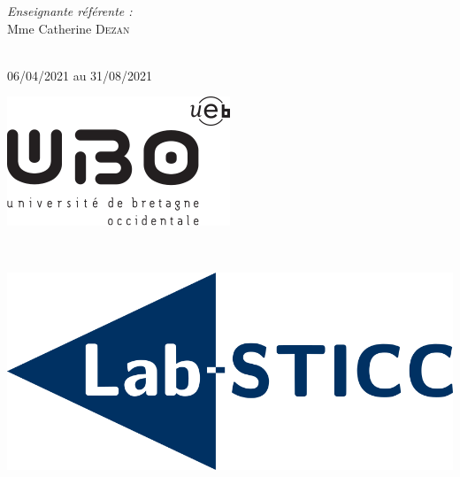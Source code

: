 \begin{titlepage}
	\begin{minipage}{0.4\textwidth}
    \begin{center} \large
    \emph{Enseignante référente :} \\
    Mme Catherine \textsc{Dezan} %
    \end{center}
    \end{minipage}\\[1cm]
    
    
    {\large 06/04/2021 au 31/08/2021}\\[1cm] %
    
    
	\begin{minipage}{0.45\textwidth}
        \begin{flushleft} \large
            \includegraphics[width=0.9\linewidth]{ubo.png} %
        \end{flushleft}
    \end{minipage}
    ~
    \begin{minipage}{0.45\textwidth}
        \begin{flushright} \large
            \includegraphics[width=0.9\linewidth]{labsticc.png} %
        \end{flushright}
    \end{minipage}
    

\end{titlepage}
